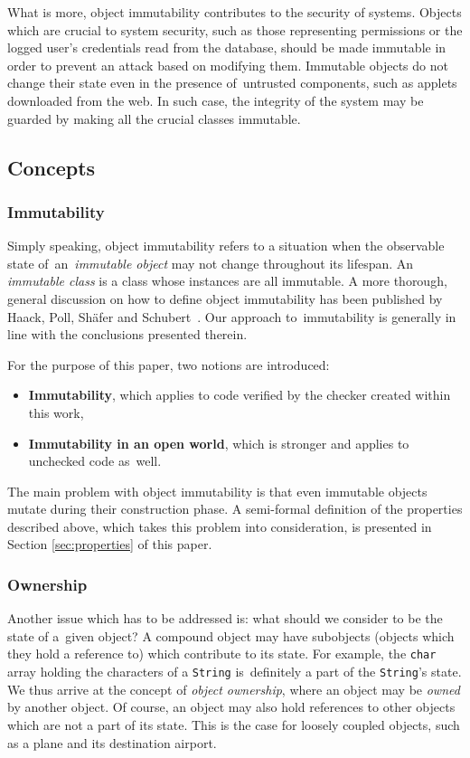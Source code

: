 \documentclass{pracamgr}
\theoremstyle{break}
\theoremstyle{break}
\theoremstyle{break}
\begin{document}
What is more, object immutability contributes to the security of
systems. Objects which are crucial to system security, such as those
representing permissions or the logged user's credentials read from
the database, should be made immutable in order to prevent an attack
based on modifying them. Immutable objects do not change their state
even in the presence of~untrusted components, such as applets
downloaded from the web. In such case, the integrity of the system may
be guarded by making all the crucial classes immutable.

\subsection{Concepts}

\subsubsection{Immutability}

Simply speaking, object immutability refers to a situation when the
observable state of~an~\emph{immutable object} may not change
throughout its lifespan. An \emph{immutable class} is a class whose
instances are all immutable. A more thorough, general discussion on
how to define object immutability has been published by Haack, Poll,
Shäfer and Schubert~\cite{jml-imm}. Our approach to~immutability is
generally in line with the conclusions presented therein.

For the purpose of this paper, two notions are introduced:
\begin{itemize}
\item \textbf{Immutability}, which applies to code verified by the
  checker created within this work,
\item \textbf{Immutability in an open world}, which is stronger and
  applies to unchecked code as~well. 
\end{itemize}

The main problem with object immutability is that even immutable
objects mutate during their construction phase. A semi-formal
definition of the properties described above, which takes this problem
into consideration, is presented in Section \ref{sec:properties} of
this paper.

\subsubsection{Ownership}

Another issue which has to be addressed is: what should we consider to
be the state of a~given object? A compound object may have subobjects
(objects which they hold a reference to) which contribute to its
state. For example, the \texttt{char} array holding the characters of
a \texttt{String} is~definitely a part of the \texttt{String}'s
state. We thus arrive at the concept of \emph{object ownership}, where
an object may be \emph{owned} by another object. Of course, an object
may also hold references to other objects which are not a part of its
state. This is the case for loosely coupled objects, such as a plane
and its destination airport. 
\end{document}
